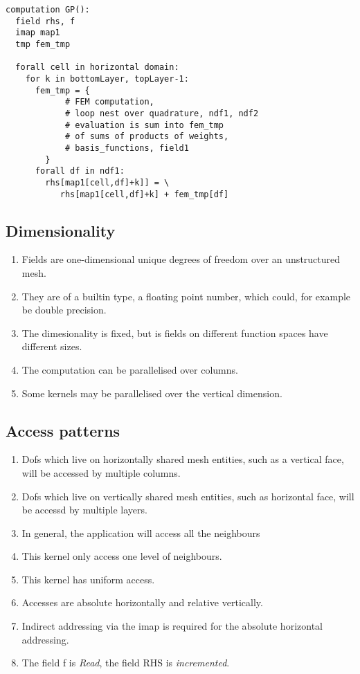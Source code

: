 \documentclass{report}
\begin{document}
\begin{lstlisting}[style=dsl]
computation GP():
  field rhs, f
  imap map1
  tmp fem_tmp

  forall cell in horizontal domain:
    for k in bottomLayer, topLayer-1:
      fem_tmp = {
            # FEM computation, 
            # loop nest over quadrature, ndf1, ndf2
            # evaluation is sum into fem_tmp
            # of sums of products of weights, 
            # basis_functions, field1
        }
      forall df in ndf1:
        rhs[map1[cell,df]+k]] = \ 
           rhs[map1[cell,df]+k] + fem_tmp[df]

\end{lstlisting}
\subsection{Dimensionality}
\begin{enumerate}
  \item Fields are one-dimensional unique degrees of freedom over an unstructured mesh.
  \item They are of a builtin type, a floating point number, which could, for example be double precision.
   \item The dimesionality is fixed, but is fields on different function spaces have different sizes.
   \item The computation can be parallelised over columns. 
   \item Some kernels may be parallelised over the vertical dimension.
\end{enumerate}

\subsection{Access patterns}
  \begin{enumerate}
     \item Dofs which live on horizontally shared mesh entities, such as a
       vertical face, will be accessed by multiple columns.
     \item Dofs which live on vertically shared mesh entities, such as
       horizontal face, will be accessd by multiple layers.
     \item In general, the application will access all the neighbours
     \item This kernel only access one level of neighbours.
     \item This kernel has uniform access.
     \item Accesses are absolute horizontally and relative vertically.
     \item Indirect addressing via the imap is required for the
       absolute horizontal addressing.
     \item The field f is {\em Read}, the field RHS is {\em incremented}.
  \end{enumerate}
\end{document}
